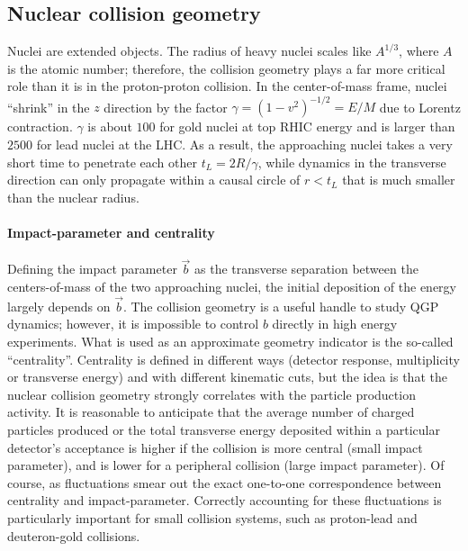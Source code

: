 \subsection{Nuclear collision geometry}
Nuclei are extended objects.
The radius of heavy nuclei scales like $A^{1/3}$, where  $A$ is the atomic number; therefore, the collision geometry plays a far more critical role than it is in the proton-proton collision.
In the center-of-mass frame,  nuclei ``shrink'' in the $z$ direction by the factor $\gamma = (1-v^2)^{-1/2} = E/M$ due to Lorentz contraction.
$\gamma$ is about $100$ for gold nuclei at top RHIC energy and is larger than $2500$ for lead nuclei at the LHC.
As a result, the approaching nuclei takes a very short time to penetrate each other $t_L = 2R/\gamma$, while dynamics in the transverse direction can only propagate within a causal circle of $r < t_L$ that is much smaller than the nuclear radius.

\paragraph{Impact-parameter and centrality} Defining the impact parameter $\vec{b}$ as the transverse separation between the centers-of-mass of the two approaching nuclei, the initial deposition of the energy largely depends on $\vec{b}$.
The collision geometry is a useful handle to study QGP dynamics; however, it is impossible to control $b$ directly in high energy experiments.
What is used as an approximate geometry indicator is the so-called ``centrality''.
Centrality is defined in different ways (detector response, multiplicity or transverse energy) and with different kinematic cuts, but the idea is that the nuclear collision geometry strongly correlates with the particle production activity.
It is reasonable to anticipate that the average number of charged particles produced or the total transverse energy deposited within a particular detector's acceptance is higher if the collision is more central (small impact parameter), and is lower for a peripheral collision (large impact parameter).
Of course,  as fluctuations smear out the exact one-to-one correspondence between centrality and impact-parameter.
Correctly accounting for these fluctuations is particularly important for small collision systems, such as proton-lead and deuteron-gold collisions.

